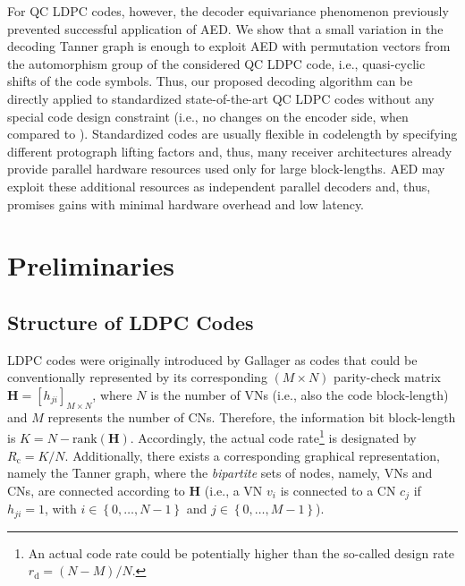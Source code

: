 \documentclass[conference]{IEEEtran}
\begin{document}
\begin{NoHyper}
For \ac{QC} \ac{LDPC} codes, however, the decoder equivariance phenomenon \cite{Chen_Cyclic_LDPC_AED} previously prevented successful application of \ac{AED}. We show that a small variation in the decoding Tanner graph is enough to exploit \ac{AED} with permutation vectors from the automorphism group of the considered \ac{QC} \ac{LDPC} code, i.e., quasi-cyclic shifts of the code symbols. Thus, our proposed decoding algorithm can be directly applied to standardized state-of-the-art \ac{QC} \ac{LDPC} codes without any special code design constraint (i.e., no changes on the encoder side, when compared to \cite{Chen_Cyclic_LDPC_AED, Zhang_Parallel_LDPC}). Standardized codes are usually flexible in codelength by specifying different protograph lifting factors and, thus, many receiver architectures already provide parallel hardware resources used only for large block-lengths. \ac{AED} may exploit these additional resources as independent parallel decoders and, thus, promises gains with minimal hardware overhead and low latency.

\section{Preliminaries}\label{sec:preliminaries}
\subsection{Structure of LDPC Codes}
LDPC codes were originally introduced by Gallager \cite{Gallager} as codes that could be conventionally represented by its corresponding $(M\times N)$ parity-check matrix $\mathbf{H} = \left [h_{ji}\right]_{M\times N}$, where $N$ is the number of \acp{VN} (i.e., also the code block-length) and $M$ represents the number of \acp{CN}. Therefore, the information bit block-length is $K = N-\text{rank}(\mathbf{H})$. Accordingly, the actual code rate\footnote{An actual code rate could be potentially higher than the so-called design rate $r_\mathrm{d} = (N-M)/N$.} is designated by $R_\mathrm{c} = K/N$. 
Additionally, there exists a corresponding graphical representation, namely the Tanner graph, where the \emph{bipartite} sets of nodes, namely, \acp{VN} and \acp{CN}, are connected according to $\mathbf{H}$ (i.e., a VN $v_i$ is connected to a \ac{CN} $c_j$ if $h_{ji} = 1$, with $i \in \left\{0,\dots, N-1\right\}$ and $j \in \left\{0,\dots, M-1\right\}$).



\end{NoHyper}
\end{document}

